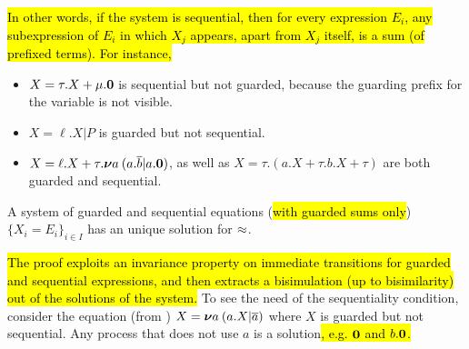 \hl{In other words, if the system is sequential, then for
every expression $E_i$, any subexpression of $E_i$ in which $X_j $
appears, apart from $X_j$ itself, is a sum (of prefixed terms).
For instance,}
\begin{itemize}
\item $X = \tau. X + \mu . {\boldsymbol 0}$ is sequential but not 
 guarded, because the guarding prefix for the variable
is not visible.

\item $X =  \ell . X | P$ is guarded but not sequential.

\item $X =  \ell . X + \tau. {\boldsymbol \nu} a\: (a .\overline{b} | a.{\boldsymbol 0})$, as well as
$X = \tau . (a. X + \tau . b .X + \tau  )$ are both guarded and sequential.
\end{itemize}

\begin{theorem}
\label{t:Mil89}
A system of guarded and sequential equations (\hl{with guarded sums only})
$\{  X_i = E_i\}_{i\in I}$ has an unique solution for $\approx$.
\end{theorem}

\hl{The proof exploits an invariance property on immediate transitions for
guarded and sequential expressions, and then extracts a bisimulation
(up to bisimilarity) out
of the solutions of the system.  }
To see the need of the sequentiality  condition, consider
 the equation (from \cite{Mil89}) $X = {\boldsymbol \nu} a\: (a. X | \overline{a})$
where $X$ is guarded but not sequential. Any process that does not use
$a$ is a solution\hl{, e.g. ${\boldsymbol 0}$ and $b.{\boldsymbol 0}$.}

